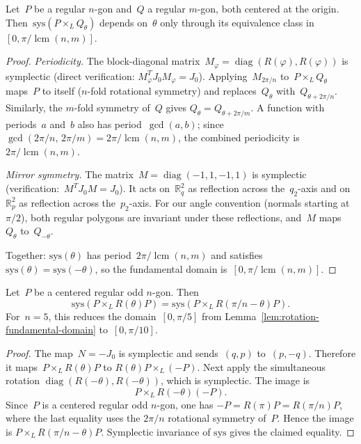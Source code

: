 \begin{lemma}
\label{lem:rotation-fundamental-domain}
Let~$P$ be a regular $n$-gon and~$Q$ a regular $m$-gon, both centered at the
origin. Then~$\mathrm{sys}(P \times_L Q_\theta)$ depends on~$\theta$ only
through its equivalence class in~$[0, \pi/\operatorname{lcm}(n,m)]$.
\end{lemma}

\begin{proof}
\emph{Periodicity.}
The block-diagonal matrix~$M_\varphi = \operatorname{diag}(R(\varphi),
R(\varphi))$ is symplectic (direct verification: $M_\varphi^T J_0 M_\varphi
= J_0$). Applying~$M_{2\pi/n}$ to~$P \times_L Q_\theta$
maps~$P$ to itself ($n$-fold rotational symmetry)
and replaces~$Q_\theta$ with~$Q_{\theta + 2\pi/n}$. Similarly, the $m$-fold symmetry of~$Q$
gives $Q_\theta = Q_{\theta + 2\pi/m}$. A function with periods~$a$
and~$b$ also has period~$\gcd(a,b)$; since
$\gcd(2\pi/n,\, 2\pi/m) = 2\pi/\operatorname{lcm}(n,m)$,
the combined periodicity is~$2\pi/\operatorname{lcm}(n,m)$.

\emph{Mirror symmetry.}
The matrix~$M = \operatorname{diag}(-1, 1, -1, 1)$ is symplectic
(verification:~$M^T J_0 M = J_0$). It acts on~$\mathbb{R}^2_q$ as reflection
across the~$q_2$-axis and on~$\mathbb{R}^2_p$ as reflection across
the~$p_2$-axis. For our angle convention (normals starting at~$\pi/2$), both
regular polygons are invariant under these reflections, and~$M$
maps~$Q_\theta$ to~$Q_{-\theta}$.

Together: $\mathrm{sys}(\theta)$ has period~$2\pi/\operatorname{lcm}(n,m)$ and
satisfies~$\mathrm{sys}(\theta) = \mathrm{sys}(-\theta)$, so the fundamental
domain is~$[0, \pi/\operatorname{lcm}(n,m)]$.
\end{proof}

\begin{lemma}
\label{lem:odd-regular-factor-swap-mirror}
Let~$P$ be a centered regular odd $n$-gon. Then
\[
  \mathrm{sys}(P \times_L R(\theta)P)
  =
  \mathrm{sys}(P \times_L R(\pi/n-\theta)P).
\]
For~$n=5$, this reduces the domain~$[0,\pi/5]$ from
Lemma~\ref{lem:rotation-fundamental-domain} to~$[0,\pi/10]$.
\end{lemma}

\begin{proof}
The map~$N=-J_0$ is symplectic and sends~$(q,p)$ to~$(p,-q)$.
Therefore it maps~$P \times_L R(\theta)P$ to
$R(\theta)P \times_L (-P)$. Next apply the simultaneous rotation
$\operatorname{diag}(R(-\theta),R(-\theta))$, which is symplectic. The image is
\[
  P \times_L R(-\theta)(-P).
\]
Since~$P$ is a centered regular odd $n$-gon, one has
$-P=R(\pi)P=R(\pi/n)P$, where the last equality uses the
$2\pi/n$ rotational symmetry of~$P$. Hence the image is
$P \times_L R(\pi/n-\theta)P$. Symplectic invariance of
$\mathrm{sys}$ gives the claimed equality.
\end{proof}
